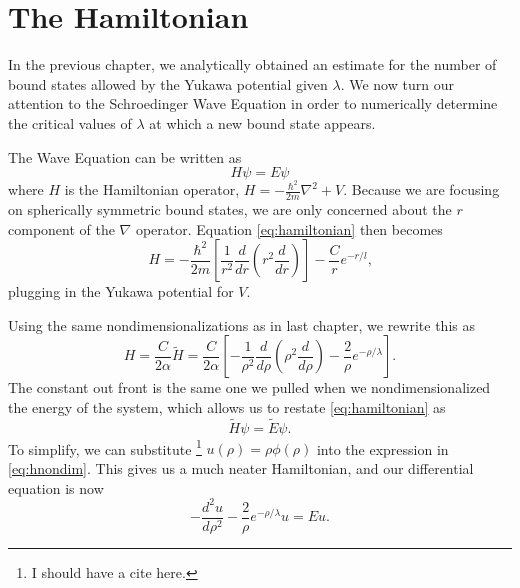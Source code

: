 \documentclass[12pt,twoside]{reedthesis}
\newcommand{\eqn}[1]{\begin{equation}#1\end{equation}}
\begin{document}
\section{The Hamiltonian}

In the previous chapter, we analytically obtained an estimate for the number of bound states allowed by the Yukawa potential given $\lambda$. We now turn our attention to the Schroedinger Wave Equation in order to numerically determine the critical values of $\lambda$ at which a new bound state appears. 

The Wave Equation can be written as
\eqn{
H \psi = E\psi
\label{eq:hamiltonian}
}
where $H$ is the Hamiltonian operator, $H =-\frac{\hbar^2}{2m}\nabla^2 +V$.  Because we are focusing on spherically symmetric bound states, we are only concerned about the $r$ component of the $\nabla$ operator. Equation \eqref{eq:hamiltonian} then becomes
\eqn{
H = -\frac{\hbar^2}{2m} \left[\frac{1}{r^2}\frac{d}{dr}\left(r^2 \frac{d}{dr}\right)\right] - \frac{C}{r}e^{-r/l}\mbox{,}
}
plugging in the Yukawa potential for $V$.

Using the same nondimensionalizations as in last chapter, we rewrite this as 
\eqn{
H=\frac{C}{2\alpha}\tilde{H} = \frac{C}{2\alpha} \left[- \frac{1}{\rho^2}\frac{d}{d\rho}\left(\rho^2\frac{d}{d\rho}\right) - \frac{2}{\rho}e^{-\rho/\lambda}\right]\mbox{.}
\label{eq:hnondim}
}
The constant out front is the same one we pulled when we nondimensionalized the energy of the system, which allows us to restate \eqref{eq:hamiltonian} as
\eqn{
\tilde{H}\psi = \tilde{E}\psi\mbox{.}
}
To simplify, we can substitute \footnote{I should have a cite here.} $u(\rho)=\rho \phi(\rho)$ into the expression in \eqref{eq:hnondim}. This gives us a much neater Hamiltonian, and our differential equation is now
\eqn{
-\frac{d^2 u }{d \rho^2} - \frac{2}{\rho}e^{-\rho/\lambda}u = E u\mbox{.}
\label{eq:hamiltonianfinal}
}
\end{document}

